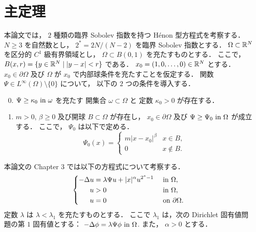 %
%

\section{主定理}

本論文では， $2$ 種類の臨界 Sobolev 指数を持つ Hénon 型方程式を考察する．
$N \geq 3$ を自然数とし， $2^* = 2N/(N-2)$ を臨界 Sobolev 指数とする．
$\Omega \subset \mathbb{R}^N$ を区分的 $C^1$ 級有界領域とし，
$\Omega \subset B(0, 1)$ を充たすものとする．
ここで， $B(x, r) = \{ y \in \mathbb{R}^N \mid \lvert y - x \rvert < r \}$
である．
$x_0 = (1, 0, \dots, 0) \in \mathbb{R}^N$ とする．
$x_0 \in \partial \Omega$ 及び
$\Omega$ が $x_0$ で内部球条件を充たすことを仮定する．
関数 $\Psi \in L^\infty(\Omega) \setminus \{ 0 \}$ について，
以下の $2$ つの条件を導入する．
\begin{enumerate}[(T1)]
  \setcounter{enumi}{-1}
  \item \label{enum:T0}
    $\Psi \geq \kappa_0 \text{ in } \omega$ を充たす
    開集合 $\omega \subset \Omega$ と
    定数 $\kappa_0 > 0$ が存在する．
  \item \label{enum:T1}
    $m > 0$, $\beta \geq 0$ 及び開球
    $B \subset \Omega$ が存在し，
    $x_0 \in \partial \Omega$ 及び
    $\Psi \geq \Psi_0 \text{ in } \Omega$ が成立する．
    ここで， $\Psi_0$ は以下で定める．
    \begin{equation}
      \Psi_0(x) =
      \begin{cases}
        m \left\lvert x - x_0 \right\rvert^\beta
        & x \in B, \\
        0 & x \not\in B.
      \end{cases}
      \label{eq:Psi_0}
    \end{equation}
\end{enumerate}

本論文の Chapter 3 では以下の方程式について考察する．
\begin{align}
  \left\{
  \begin{aligned}
    - \Delta u & = \lambda \Psi u + \lvert x \rvert^\alpha u^{2^*-1}
               &                                                     & \text{ in } \Omega,                        \\
    u          & > 0                                                 &              & \text{ in } \Omega,         \\
    u          & = 0                                                 &              & \text{ on } \partial\Omega.
  \end{aligned}
  \right. \label{eq:henon_prob_main}
\end{align}
定数 $\lambda$ は $\lambda < \lambda_1$ を充たすものとする．
ここで $\lambda_1$ は，次の
Dirichlet 固有値問題の第 $1$ 固有値とする：
$-\Delta \phi = \lambda \Psi \phi \text{ in } \Omega$.
また， $\alpha > 0$ とする．

